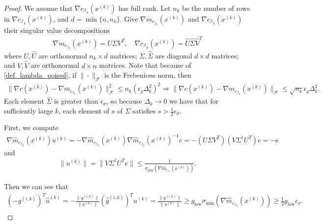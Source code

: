 \documentclass{article}
\theoremstyle{case}
\newcommand{\dk}{\Delta_k}
\newcommand{\xk}{{x^{(k)}}}
\newcommand{\gik}{{g^{(i, k)}}}
\newcommand{\hgik}{{{\hat g}^{(i, k)}}}
\newcommand{\uk}{{u^{(k)}}}
\newcommand{\huk}{{{\hat u}^{(k)}}}
\begin{document}
\begin{proof}
We assume that $\nabla c_{\mathcal I_k}(\xk)$ has full rank.
Let $n_k$ be the number of rows in $\nabla c_{\mathcal I_k}(\xk)$, and $d = \min \{ n, n_k \}$.
Give $\nabla m_{c_{\mathcal I_k}}(\xk)$ and $\nabla c_{\mathcal I_k}(\xk)$ their singular value decompositions
\begin{align*}
\nabla m_{c_{\mathcal I_k}}(\xk) = U\Sigma V^T, \quad
\nabla c_{\mathcal I_k}(\xk) = \hat U \hat \Sigma \hat V^T
\end{align*}
where $U, \hat U$ are orthonormal $n_k \times d$ matrices; $\Sigma, \hat \Sigma$ are diagonal $d \times d$ matrices; and $V, \hat V$ are orthonormal $d \times n$ matrices.
Note that because of \cref{def_lambda_poised}, if $\|\cdot\|_{\mathcal F}$ is the Frebenious norm, then
\begin{align*}
\|\nabla c(\xk) - \nabla m_{c_{\mathcal I_k}}(\xk)\|_{\mathcal F}^2 \le n_k \left(\epsilon_g \dk^2\right)^2
\Longrightarrow \|\nabla c(\xk) - \nabla m_{c_{\mathcal I_k}}(\xk)\|_{\mathcal F} \le \sqrt{n_k} \epsilon_g \dk^2.
\end{align*}
Each element $\hat \Sigma$ is greater than $\epsilon_{\sigma}$, so because $\dk \to 0$ we have that for sufficiently large $k$, each element of $s$ of $\Sigma$ satisfies $s > \frac 1 2 \epsilon_{\sigma}$.

First, we compute
\begin{align*}
\nabla \hat m_{c_{\mathcal I_k} }(\xk) \uk = -\nabla\hat m_{c_{\mathcal I_k} }(\xk) \nabla\hat m_{c_{\mathcal I_k} }(\xk)^{-1} e
= -(U\Sigma V^T)(V\Sigma^{\dagger} U^T)e
= -e 
\end{align*}
and
\begin{align*}
\|\uk\| = \|V\Sigma^{\dagger} U^Te\|  
\le \frac 1 {\sigma_{\text{min}}\left(\nabla \hat m_{c_{\mathcal I_k}}(\xk)\right)}.
\end{align*}

Then we can see that
\begin{align*}
(-\gik)^T\huk = -\frac{\|\gik\|}{\|\uk\|}(\hgik)^T\uk = \frac{\|\gik\|}{\|\uk\|} \ge g_{\text{low}} \sigma_{\text{min}}\left(\nabla \hat m_{c_{\mathcal I_k}}(\xk)\right) \ge \frac 1 2 g_{\text{low}}\epsilon_{\sigma}. \\
\end{align*}



\end{proof}
\end{document}
